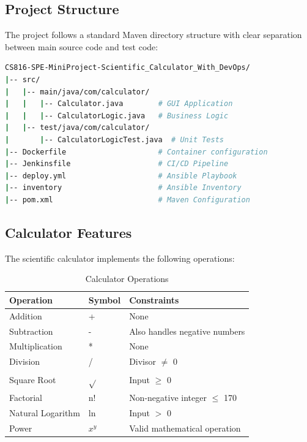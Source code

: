 \documentclass[12pt,a4paper]{article}
\begin{document}
\subsection{Project Structure}

The project follows a standard Maven directory structure with clear separation between main source code and test code:

\begin{lstlisting}[language=bash, caption=Project Directory Structure]
CS816-SPE-MiniProject-Scientific_Calculator_With_DevOps/
|-- src/
|   |-- main/java/com/calculator/
|   |   |-- Calculator.java        # GUI Application
|   |   |-- CalculatorLogic.java   # Business Logic
|   |-- test/java/com/calculator/
|       |-- CalculatorLogicTest.java  # Unit Tests
|-- Dockerfile                     # Container configuration
|-- Jenkinsfile                    # CI/CD Pipeline
|-- deploy.yml                     # Ansible Playbook
|-- inventory                      # Ansible Inventory
|-- pom.xml                        # Maven Configuration
\end{lstlisting}

\subsection{Calculator Features}

The scientific calculator implements the following operations:

\begin{table}[H]
    \centering
    \begin{tabular}{|l|l|l|}
        \hline
        \textbf{Operation} & \textbf{Symbol} & \textbf{Constraints} \\
        \hline
        Addition & + & None \\
        Subtraction & - & Also handles negative numbers \\
        Multiplication & * & None \\
        Division & / & Divisor $\neq$ 0 \\
        Square Root & $\sqrt{}$ & Input $\geq$ 0 \\
        Factorial & n! & Non-negative integer $\leq$ 170 \\
        Natural Logarithm & ln & Input $>$ 0 \\
        Power & $x^y$ & Valid mathematical operation \\
        \hline
    \end{tabular}
    \caption{Calculator Operations}
\end{table}
\end{document}
